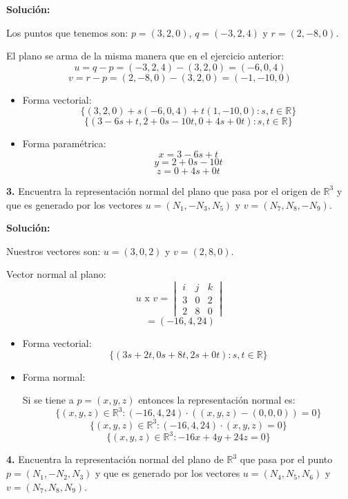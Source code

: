 \documentclass{article}
\begin{document}
\textbf{Solución:}
\vspace{10pt}

Los puntos que tenemos son: $p = (3,2,0)$, $q = (-3,2,4)$ y $r = (2,-8,0)$.

El plano se arma de la misma manera que en el ejercicio anterior:
$$u = q-p = (-3,2,4)-(3,2,0)=(-6,0,4)$$
$$v=r-p=(2,-8,0)-(3,2,0)=(-1,-10,0)$$

\begin{itemize}
    \item Forma vectorial:
    $$\{(3,2,0)+s(-6,0,4)+t(1,-10,0):s,t\in \mathbb{R}\}$$
    $$\{(3-6s+t, 2+0s-10t, 0+4s+0t): s,t \in \mathbb{R}\}$$
    \item Forma paramétrica:
    $$x =3-6s+t$$
    $$y = 2+0s-10t$$
    $$z = 0+4s+0t$$
\end{itemize}
\vspace{10pt}

\textbf{3.} Encuentra la representación normal del plano que pasa por el origen de $\mathbb{R}^3$ y que es generado por los vectores 
$u = (N_1, -N_3, N_5)$ y $v = (N_7, N_8, -N_9)$.
\vspace{10pt}

\textbf{Solución:}
\vspace{10pt}

Nuestros vectores son: $u = (3, 0, 2)$ y $v = (2, 8, 0)$.

Vector normal al plano:
$$u \text{ x } v = \begin{vmatrix}
    i & j & k \\
    3 & 0 & 2 \\
    2 & 8 & 0
\end{vmatrix}$$
$$ = (-16, 4, 24)$$

\begin{itemize}
    \item Forma vectorial:
    $$\{(3s+2t,0s+8t,2s+0t): s,t \in \mathbb{R}\}$$
    \item Forma normal:
    
    Si se tiene a $p =(x,y,z)$ entonces la representación normal es:
    $$\{(x,y,z) \in \mathbb{R}^3: (-16,4,24)\cdot((x,y,z)-(0,0,0)) = 0\}$$
    $$\{(x,y,z) \in \mathbb{R}^3: (-16,4,24)\cdot(x,y,z)= 0\}$$
    $$\{(x,y,z) \in \mathbb{R}^3: -16x+4y+24z = 0\}$$
\end{itemize}
\vspace{10pt}

\textbf{4.} Encuentra la representación normal del plano de $\mathbb{R}^3$ que pasa por el punto 
$p = (N_1, -N_2, N_3)$ y que es generado por los vectores $u = (N_4, N_5, N_6)$ y $v = (N_7, N_8, N_9)$.
\vspace*{10pt}
\end{document}
